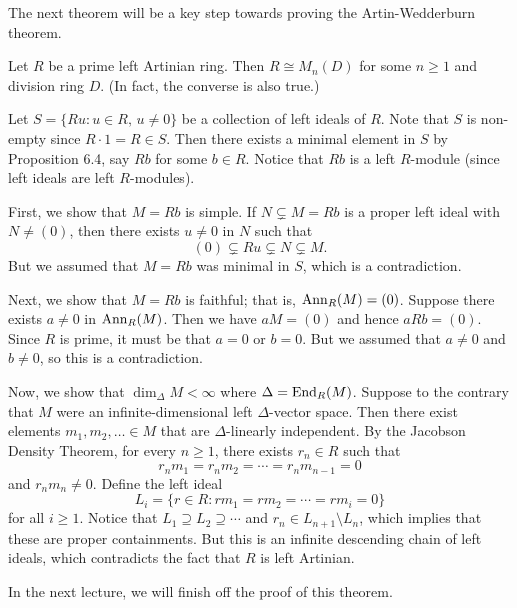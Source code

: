 The next theorem will be a key step towards proving the Artin-Wedderburn theorem.

\begin{theo}{}
Let $R$ be a prime left Artinian ring. Then $R \cong M_n(D)$ for some $n \geq 1$ and division ring 
$D$. (In fact, the converse is also true.)
\end{theo}
\begin{pf}
Let $S = \{Ru : u \in R,\, u \neq 0\}$ be a collection of left ideals of $R$. Note that $S$ 
is non-empty since $R \cdot 1 = R \in S$. Then there exists a minimal element in $S$ by Proposition 
6.4, say $Rb$ for some $b \in R$. Notice that $Rb$ is a left $R$-module (since 
left ideals are left $R$-modules). 

First, we show that $M = Rb$ is simple. If $N \subsetneq M = Rb$ is a proper left ideal with 
$N \neq (0)$, then there exists $u \neq 0$ in $N$ such that 
\[ (0) \subsetneq Ru \subsetneq N \subsetneq M. \]
But we assumed that $M = Rb$ was minimal in $S$, which is a contradiction. 

Next, we show that $M = Rb$ is faithful; that is, $\operatorname{Ann}_R(M) = (0)$. Suppose there exists 
$a \neq 0$ in $\operatorname{Ann}_R(M)$. Then we have $aM = (0)$ and hence $aRb = (0)$. Since $R$ is prime,
it must be that $a = 0$ or $b = 0$. But we assumed that $a \neq 0$ and $b \neq 0$, so this is 
a contradiction. 

Now, we show that $\dim_\Delta M < \infty$ where $\Delta = \operatorname{End}_R(M)$. Suppose to the contrary 
that $M$ were an infinite-dimensional left $\Delta$-vector space. Then there exist elements 
$m_1, m_2, \dots \in M$ that are $\Delta$-linearly independent. By the Jacobson Density Theorem, 
for every $n \geq 1$, there exists $r_n \in R$ such that 
\[ r_nm_1 = r_nm_2 = \cdots = r_nm_{n-1} = 0 \]
and $r_nm_n \neq 0$. Define the left ideal 
\[ L_i = \{r \in R : rm_1 = rm_2 = \cdots = rm_i = 0\} \]
for all $i \geq 1$. Notice that $L_1 \supseteq L_2 \supseteq \cdots$ and $r_n \in L_{n+1} \setminus L_n$,
which implies that these are proper containments. But this is an infinite descending chain of 
left ideals, which contradicts the fact that $R$ is left Artinian. 

In the next lecture, we will finish off the proof of this theorem.
\end{pf}